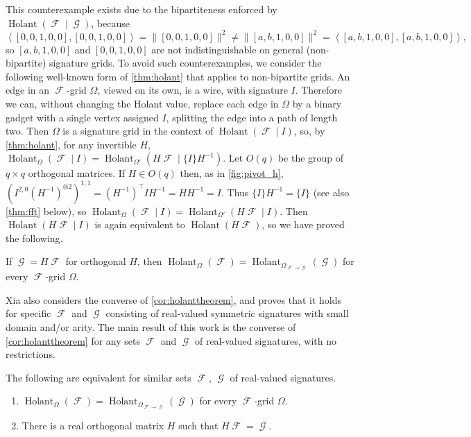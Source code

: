 \documentclass{theoretics}
\DeclareMathOperator{\fc}{\mathcal{F}}
\DeclareMathOperator{\gc}{\mathcal{G}}
\DeclareMathOperator{\holant}{Holant}
\begin{document}
This counterexample exists due to 
the bipartiteness enforced by $\holant(\fc \mid \gc)$, because
\[
    \left\langle [0,0,1,0,0],[0,0,1,0,0]\right\rangle = \|[0,0,1,0,0]\|^2
    \neq \|[a,b,1,0,0]\|^2 = \left\langle [a,b,1,0,0],[a,b,1,0,0] \right\rangle,
\]
so $[a,b,1,0,0]$ and $[0,0,1,0,0]$ are not indistinguishable on
general (non-bipartite) signature grids. To avoid such counterexamples, we consider the
following well-known form of \autoref{thm:holant} that applies to non-bipartite grids.
An edge in an $\fc$-grid $\Omega$, viewed on its own, is a wire,
with signature $I$. Therefore we can, without changing the Holant value, replace each edge in 
$\Omega$ by a binary gadget with a single vertex assigned $I$, splitting the edge into a path
of length two. Then $\Omega$ is a signature grid in the context of
$\holant(\fc \mid I)$, so, by \autoref{thm:holant}, for any invertible $H$,
$\holant_\Omega(\fc \mid I) = \holant_{\Omega'}(H\fc \mid \{I\}H^{-1})$. 
Let $O(q)$ be the group of $q \times q$ orthogonal matrices.
If $H \in O(q)$ then, as in \autoref{fig:pivot_h}, $(I^{2,0} (H^{-1})^{\otimes 2})^{1,1}
= (H^{-1})^\top I H^{-1} = H H^{-1} = I$. Thus $\{I\} H^{-1} = \{I\}$ 
(see also \autoref{thm:fft} below), so
$\holant_\Omega(\fc \mid I) = \holant_{\Omega'}(H\fc \mid I)$. Then $\holant(H\fc \mid I)$
is again equivalent to $\holant(H\fc)$, so we have proved the following.
\begin{corollary}
    \label{cor:holanttheorem}
    If $\gc = H\fc$ for orthogonal $H$, then $\holant_\Omega(\fc) = \holant_{\Omega_{\fc\to\gc}}(\gc)$ for every $\fc$-grid $\Omega$.
\end{corollary}
Xia \cite{xia} also considers the converse of \autoref{cor:holanttheorem}, and proves that it holds
for specific $\fc$ and $\gc$ consisting of real-valued symmetric signatures with small domain
and/or arity.
The main result of this work is the converse of \autoref{cor:holanttheorem} for any
sets $\fc$ and $\gc$ of real-valued signatures, with no restrictions.
\begin{theorem}
    \label{thm:result}
    The following are equivalent for similar sets $\fc$, $\gc$ of real-valued signatures. 
    \begin{enumerate}[label=(\roman*)]
        \item $\holant_{\Omega}(\fc) = \holant_{\Omega_{\fc\to\gc}}(\gc)$
        for every $\fc$-grid $\Omega$.
        \item There is a real orthogonal matrix $H$ such that $H\fc = \gc$.
    \end{enumerate}
\end{theorem}
\end{document}

